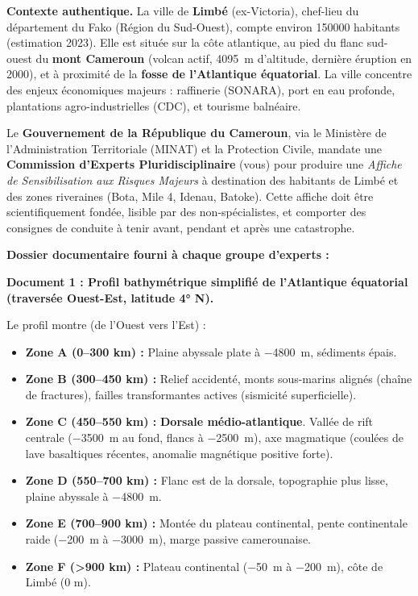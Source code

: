 \documentclass[11pt]{article}
\newcounter{popsec}
\newcounter{popsub}
\newcommand{\courssub}[1]{%
  \stepcounter{popsub}%
  \par\vspace{9pt}\noindent{\popxbold\fontsize{11.5}{13}\selectfont\color{popink}{\color{poporange}\thepopsec.\thepopsub}\hspace{6pt}#1}\par\nopagebreak\vspace{4pt}
}
\begin{document}
\courssub{Situation}
\par
\textbf{Contexte authentique.} La ville de \textbf{Limbé} (ex-Victoria), chef-lieu du département du Fako (Région du Sud-Ouest), compte environ \num{150000} habitants (estimation 2023). Elle est située sur la côte atlantique, au pied du flanc sud-ouest du \textbf{mont Cameroun} (volcan actif, \SI{4095}{m} d'altitude, dernière éruption en 2000), et à proximité de la \textbf{fosse de l'Atlantique équatorial}. La ville concentre des enjeux économiques majeurs : raffinerie (SONARA), port en eau profonde, plantations agro-industrielles (CDC), et tourisme balnéaire.

\par
Le \textbf{Gouvernement de la République du Cameroun}, via le Ministère de l'Administration Territoriale (MINAT) et la Protection Civile, mandate une \textbf{Commission d'Experts Pluridisciplinaire} (vous) pour produire une \emph{Affiche de Sensibilisation aux Risques Majeurs} à destination des habitants de Limbé et des zones riveraines (Bota, Mile 4, Idenau, Batoke). Cette affiche doit être scientifiquement fondée, lisible par des non-spécialistes, et comporter des consignes de conduite à tenir avant, pendant et après une catastrophe.

\par
\textbf{Dossier documentaire fourni à chaque groupe d'experts :}

\par
\textbf{Document 1 : Profil bathymétrique simplifié de l'Atlantique équatorial (traversée Ouest-Est, latitude 4° N).}
\par
Le profil montre (de l'Ouest vers l'Est) :
\begin{itemize}
    \item \textbf{Zone A (0--300 km) :} Plaine abyssale plate à \SI{-4800}{m}, sédiments épais.
    \item \textbf{Zone B (300--450 km) :} Relief accidenté, monts sous-marins alignés (chaîne de fractures), failles transformantes actives (sismicité superficielle).
    \item \textbf{Zone C (450--550 km) :} \textbf{Dorsale médio-atlantique}. Vallée de rift centrale (\SI{-3500}{m} au fond, flancs à \SI{-2500}{m}), axe magmatique (coulées de lave basaltiques récentes, anomalie magnétique positive forte).
    \item \textbf{Zone D (550--700 km) :} Flanc est de la dorsale, topographie plus lisse, plaine abyssale à \SI{-4800}{m}.
    \item \textbf{Zone E (700--900 km) :} Montée du plateau continental, pente continentale raide (\SI{-200}{m} à \SI{-3000}{m}), marge passive camerounaise.
    \item \textbf{Zone F (>900 km) :} Plateau continental (\SI{-50}{m} à \SI{-200}{m}), côte de Limbé (0 m).
\end{itemize}
\end{document}
